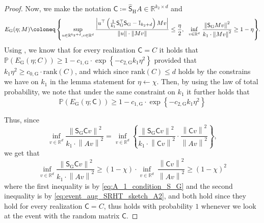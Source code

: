 \documentclass[11pt]{article}
\theoremstyle{definition}
\theoremstyle{plain}
\newcommand{\reals}{\mathbb{R}}
\providecommand{\brI}{\mathbb{I}}
\newcommand{\Norm}[1]{\left\| #1 \right\|}
\providecommand{\norm}[1]{\Norm{#1}}
\begin{document}
\begin{proof}
Now, we make the notation $\mathsf{C} \coloneq \widehat{\mathsf{S}}_{\mathrm{H}}A \in \reals^{k_2\times d}$ and 
\begin{equation}
    \label{eq:A_1_condition_S_G}
    E_{\mathrm{G}}(\eta; M) \coloneq \left\{\sup_{u \in \reals^{k_2+d}, v \in \reals^{d}} \frac{\left|u^{\top}\left(\frac{1}{k_1}\mathsf{S}^{\top}_{\mathrm{G}}\mathsf{S}_{\mathrm{G}} - \brI_{k_2+d}\right) M v\right|}{\norm{u} \cdot \norm{M v}} \leq \frac{\eta}{2}, \ \ \underset{v\in \reals^{d}}{\inf} \ \frac{\norm{\mathsf{S}_{\mathrm{G}}Mv}^2}{k_1 \cdot \norm{Mv}^2} \geq 1 - \eta\right\}\hspace{-0.25em}.
\end{equation}
Using \citet[Lemma.~1]{pilanci_hessiansketch}, we know that for every realization $\mathsf{C} = C$ it holds that $\mathbb{P}\left(E_{\mathrm{G}}(\eta; C)\right) \geq 1 - c_{1, \mathrm{G}} \cdot \exp\left\{-c_{2, \mathrm{G}} k_1 \eta^2\right\}$ provided that $k_1 \eta^2 \geq c_{0, \mathrm{G}} \cdot \mathrm{rank}(C)$, and which since $\mathrm{rank}(C) \leq d$ holds by the constrains we have on $k_1$ in the lemma statement for $\eta \gets \chi$. Then, by using the law of total probability, we note that under the same constraint on $k_1$ it further holds that 
\begin{equation}
    \mathbb{P}\left(E_{\mathrm{G}}(\eta; \mathsf{C})\right) \geq 1 - c_{1, \mathrm{G}} \cdot \exp\left\{-c_{2, \mathrm{G}} k_1 \eta^2\right\}
\end{equation}

Thus, since 
\begin{equation}
    \inf_{v \in \reals^{d}} \frac{\norm{\mathsf{S}_{\mathrm{G}}\mathsf{C} v}^2}{k_1 \cdot \norm{Av}^{2}} = \inf_{v \in \reals^{d}} \left\{\frac{\norm{\mathsf{S}_{\mathrm{G}}\mathsf{C} v}^2}{k_1 \cdot \norm{\mathsf{C}v}^{2}}\cdot\frac{\norm{\mathsf{C}v}^{2}}{\norm{A v}^2}\right\},
\end{equation}
we get that 
\begin{equation}
    \inf_{v \in \reals^{d}} \frac{\norm{\mathsf{S}_{\mathrm{G}}\mathsf{C} v}^2}{k_1 \cdot \norm{Av}^{2}} \geq (1-\chi) \cdot \underset{v\in \reals^{d}}{\inf} \ \frac{\norm{\mathsf{C} v}^2}{\norm{Av}^{2}} \geq (1-\chi)^2
\end{equation}
where the first inequality is by \eqref{eq:A_1_condition_S_G} and the second inequality is by \eqref{eq:event_aug_SRHT_sketch_A2}, and both hold since they hold for every realization $\mathsf{C} = C$, thus holds with probability $1$ whenever we look at the event with the random matrix $\mathsf{C}$. %


\end{proof}
\end{document}

